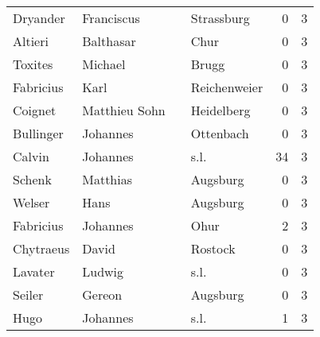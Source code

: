 \documentclass[10pt,a4paper,landscape]{article}
\begin{document}
\begin{longtable}{llllrr}
                 Dryander &                         Franciscus &             &                                  Strassburg &          0 &         3 \\
                  Altieri &                          Balthasar &             &                                        Chur &          0 &         3 \\
                  Toxites &                            Michael &             &                                       Brugg &          0 &         3 \\
                Fabricius &                               Karl &             &                                Reichenweier &          0 &         3 \\
                  Coignet &                      Matthieu Sohn &             &                                  Heidelberg &          0 &         3 \\
                Bullinger &                           Johannes &             &                                   Ottenbach &          0 &         3 \\
                   Calvin &                           Johannes &             &                                        s.l. &         34 &         3 \\
                   Schenk &                           Matthias &             &                                    Augsburg &          0 &         3 \\
                   Welser &                               Hans &             &                                    Augsburg &          0 &         3 \\
                Fabricius &                           Johannes &             &                                        Ohur &          2 &         3 \\
                Chytraeus &                              David &             &                                     Rostock &          0 &         3 \\
                  Lavater &                             Ludwig &             &                                        s.l. &          0 &         3 \\
                   Seiler &                             Gereon &             &                                    Augsburg &          0 &         3 \\
                     Hugo &                           Johannes &             &                                        s.l. &          1 &         3 \\

\end{longtable}
\end{document}
